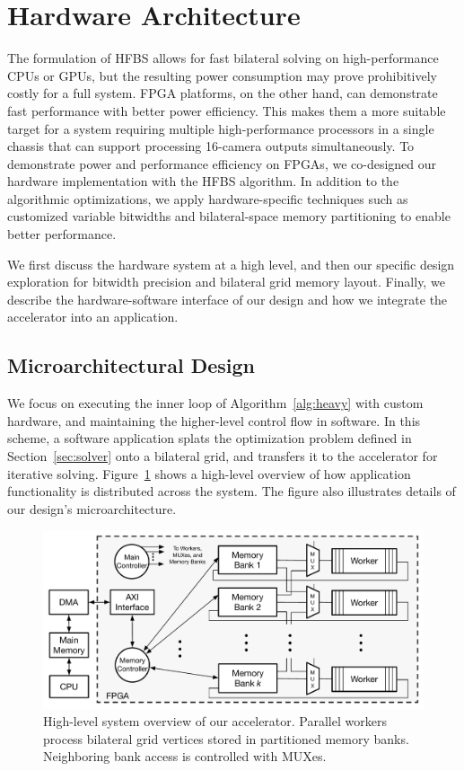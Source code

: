 \section{Hardware Architecture}

The formulation of HFBS allows for fast bilateral solving on high\hyp{}performance CPUs or GPUs, but the resulting power consumption may prove prohibitively costly for a full system.
FPGA platforms, on the other hand, can demonstrate fast performance with better power efficiency.
This makes them a more suitable target for a system requiring multiple high\hyp{}performance processors in a single chassis that can support processing 16-camera outputs simultaneously.
To demonstrate power and performance efficiency on FPGAs, we co-designed our hardware implementation with the HFBS algorithm.
In addition to the algorithmic optimizations, we apply hardware-specific techniques such as customized variable bitwidths and bilateral-space memory partitioning to enable better performance.

We first discuss the hardware system at a high level, and then our specific design exploration for bitwidth precision and bilateral grid memory layout.
Finally, we describe the hardware-software interface of our design and how we integrate the accelerator into an application.


\subsection{Microarchitectural Design}

We focus on executing the inner loop of Algorithm~\ref{alg:heavy} with custom hardware, and maintaining the higher-level control flow in software.
In this scheme, a software application splats the optimization problem defined in Section~\ref{sec:solver} onto a bilateral grid, and transfers it to the accelerator for iterative solving.
Figure~\ref{fig:sys-overview} shows a high-level overview of how application functionality is distributed across the system.
The figure also illustrates details of our design's microarchitecture.

\begin{figure}[h]
\centering
\includegraphics[width=.5\columnwidth]{hfbs-figs/system_architecture.pdf}

\caption{High-level system overview of our accelerator. Parallel workers process bilateral grid vertices stored in partitioned memory banks.
Neighboring bank access is controlled with MUXes.
}
\label{fig:sys-overview}

\end{figure}

